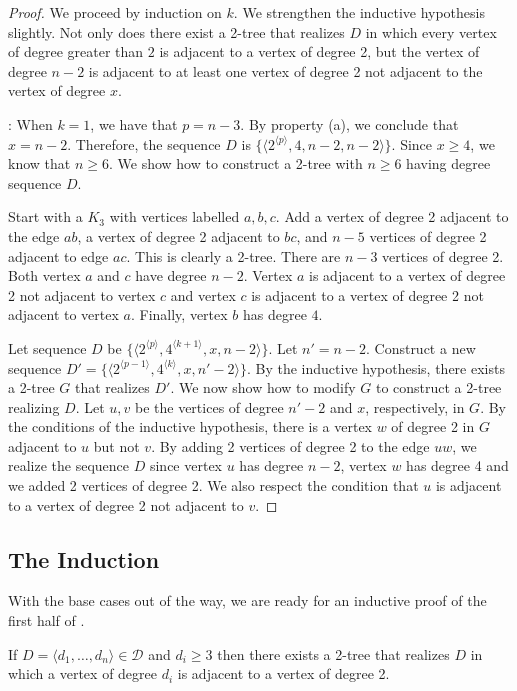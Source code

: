 \documentclass[lotsofwhite,charterfonts]{patmorin}
\newcommand{\rep}[1]{^{\langle#1\rangle}}
\begin{document}
\begin{proof}
We proceed by induction on $k$. We strengthen the inductive hypothesis
slightly. Not only does there exist a 2-tree that realizes $D$ in
which every vertex of degree greater than $2$ is adjacent to a vertex
of degree 2, but the vertex of degree $n-2$ is adjacent to at least
one vertex of degree 2 not adjacent to the vertex of degree $x$.

: When $k=1$, we have that
$p=n-3$. By property (a), we conclude that $x=n-2$. Therefore, the
sequence $D$ is $\{ \langle 2\rep{p},4,n-2,n-2\rangle\}$. Since $x\geq
4$, we know that $n\geq 6$.  We show how to construct a 2-tree with
$n\geq 6$ having degree sequence $D$.

Start with a $K_3$ with vertices labelled $a, b, c$.  Add a vertex of
degree 2 adjacent to the edge $ab$, a vertex of degree 2 adjacent to
$bc$, and $n-5$ vertices of degree 2 adjacent to edge $ac$. This is
clearly a 2-tree. There are $n-3$ vertices of degree 2. Both vertex
$a$ and $c$ have degree $n-2$. Vertex $a$ is adjacent to a vertex of
degree 2 not adjacent to vertex $c$ and vertex $c$ is adjacent to a
vertex of degree 2 not adjacent to vertex $a$.  Finally, vertex $b$
has degree $4$.

 Let sequence $D$ be $\{ \langle
2\rep{p},4\rep{k+1},x,n-2\rangle\}$.  Let $n'=n-2$. Construct a new
sequence $D' = \{ \langle 2\rep{p-1},4\rep{k},x,n'-2\rangle\}$.  By
the inductive hypothesis, there exists a 2-tree $G$ that realizes
$D'$. We now show how to modify $G$ to construct a 2-tree realizing
$D$.  Let $u,v$ be the vertices of degree $n'-2$ and $x$,
respectively, in $G$. By the conditions of the inductive hypothesis,
there is a vertex $w$ of degree 2 in $G$ adjacent to $u$ but not
$v$. By adding 2 vertices of degree 2 to the edge $uw$, we realize the
sequence $D$ since vertex $u$ has degree $n-2$, vertex $w$ has degree
4 and we added 2 vertices of degree 2. We also respect the condition
that $u$ is adjacent to a vertex of degree 2 not adjacent to $v$.
\end{proof}

\subsection{The Induction}

With the base cases out of the way, we are ready for an inductive
proof of the first half of .

\begin{lem}
If $D=\langle d_1,\ldots,d_n\rangle \in \mathcal{D}$ and $d_i\ge 3$
then there exists a 2-tree that realizes $D$ in which a vertex of
degree $d_i$ is adjacent to a vertex of degree 2.  
\end{lem}
\end{document}

